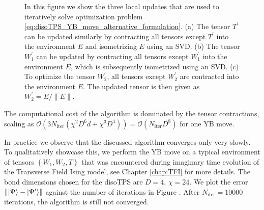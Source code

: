 \begin{figure}
\begin{subfigure}[c]{0.85\textwidth}
		\caption{}\label{fig:YB_move_iterate_polar_optimize_W2}
	\end{subfigure}%
	\caption{In this figure we show the three local updates that are used to iteratively solve optimization problem \eqref{eq:disoTPS_YB_move_alternative_formulation}. (a) The tensor $T^\prime$ can be updated similarly by contracting all tensors except $T^\prime$ into the environment $E$ and isometrizing $E$ using an SVD. (b) The tensor $W_1^\prime$ can be updated by contracting all tensors except $W_1^\prime$ into the environment $E$, which is subsequently isometrized using an SVD. (c) To optimize the tensor $W_2^\prime$, all tensors except $W_2^\prime$ are contracted into the environment $E$. The updated tensor is then given as $W_2^\prime = E/\lVert E\rVert$.}
	\label{fig:YB_move_iterate_polar}
\end{figure}
The computational cost of the algorithm is dominated by the tensor contractions, scaling as $\mathcal{O}(3N_\text{iter}(\chi^2D^6d + \chi^3D^4)) = \mathcal{O}(N_\text{iter}D^8)$ for one YB move.\par

In practice we observe that the discussed algorithm converges only very slowly. To qualitatively showcase this, we perform the YB move on a typical environment of tensors $\left\{W_1, W_2, T\right\}$ that was encountered during imaginary time evolution of the Transverse Field Ising model, see Chapter \ref{chap:TFI} for more details. The bond dimensions chosen for the disoTPS are $D = 4$, $\chi = 24$. We plot the error $\lVert\ket{\Psi}-\ket{\Psi^\prime}\rVert$ against the number of iterations in Figure . After $N_\text{iter}=10000$ iterations, the algorithm is still not converged.